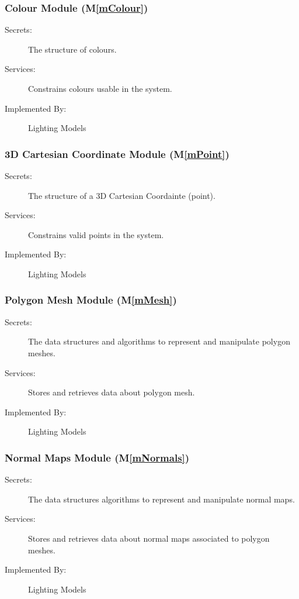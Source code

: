 \documentclass[12pt, titlepage]{article}
\newcommand{\mref}[1]{M\ref{#1}}
\begin{document}
\subsubsection{Colour Module (\mref{mColour})}
\begin{description}
	\item[Secrets:]The structure of colours.
	\item[Services:]Constrains colours usable in the system.
	\item[Implemented By:] Lighting Models
\end{description}

\subsubsection{3D Cartesian Coordinate Module (\mref{mPoint})}
\begin{description}
	\item[Secrets:]The structure of a 3D Cartesian Coordainte (point).
	\item[Services:]Constrains valid points in the system.
	\item[Implemented By:] Lighting Models
\end{description}

\subsubsection{Polygon Mesh Module (\mref{mMesh})}
\begin{description}
	\item[Secrets:]The data structures and algorithms to represent and 
	manipulate polygon meshes.
	\item[Services:]Stores and retrieves data about polygon mesh.
	\item[Implemented By:] Lighting Models
\end{description}

\subsubsection{Normal Maps Module (\mref{mNormals})}
\begin{description}
	\item[Secrets:]The data structures algorithms to represent and manipulate 
	normal maps.
	\item[Services:]Stores and retrieves data about normal maps associated to 
	polygon meshes.
	\item[Implemented By:] Lighting Models
\end{description}
\end{document}

